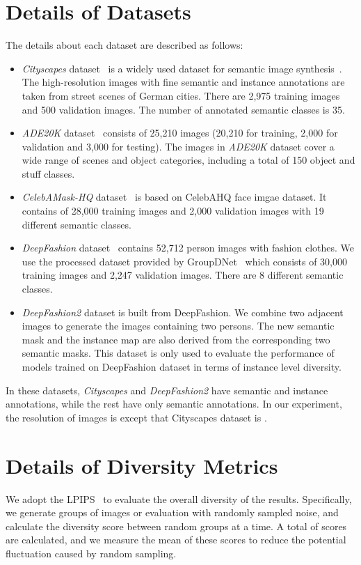 \documentclass[final]{cvpr}
\begin{document}
\section{Details of Datasets}
The details about each dataset are described as follows:
\begin{itemize}
    \item \textit{Cityscapes} dataset~\cite{cordts2016cityscapes} is a widely used dataset for semantic image synthesis~\cite{wang2018video,qi2018semi,wang2018high}. The high-resolution images with fine semantic and instance annotations are taken from street scenes of German cities. There are 2,975 training images and 500 validation images. The number of annotated semantic classes is 35. 
    \item \textit{ADE20K} dataset~\cite{zhou2017scene} consists of 25,210 images (20,210 for training, 2,000 for validation and 3,000 for testing). The images in \textit{ADE20K} dataset cover a wide range of scenes and object categories, including a total of 150 object and stuff classes. 
    \item \textit{CelebAMask-HQ} dataset~\cite{lee2020maskgan,karras2017progressive,liu2015deep} is based on CelebAHQ face imgae dataset. It contains of 28,000 training images and 2,000 validation images with 19 different semantic classes. 
    \item \textit{DeepFashion} dataset~\cite{liu2016deepfashion} contains 52,712 person images with fashion clothes. We use the processed dataset provided by GroupDNet~\cite{zhu2020semantically} which consists of 30,000 training images and 2,247 validation images. There are 8 different semantic classes.
    \item \textit{DeepFashion2} dataset is built from DeepFashion. We combine two adjacent images to generate the images containing two persons. The new semantic mask and the instance map are also derived from the corresponding two semantic masks. This dataset is only used to evaluate the performance of models trained on DeepFashion dataset in terms of instance level diversity.
\end{itemize}
In these datasets, \textit{Cityscapes} and \textit{DeepFashion2} have semantic and instance annotations, while the rest have only semantic annotations. In our experiment, the resolution of images is  except that Cityscapes dataset is .

\section{Details of Diversity Metrics}
We adopt the LPIPS~\cite{zhang2018unreasonable,github-lpips} to evaluate the overall diversity of the results. Specifically, we generate  groups of images or evaluation with randomly sampled noise, and calculate the diversity score between  random groups at a time. A total of  scores are calculated, and we measure the mean of these scores to reduce the potential fluctuation caused by random sampling.
\end{document}
